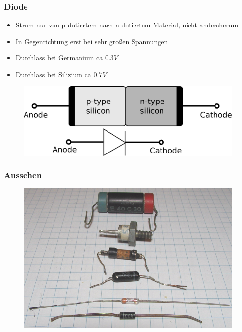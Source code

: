 \begin{frame}
  \frametitle{Diode}
  \begin{center}
    \begin{itemize}
      \item Strom nur von p-dotiertem nach n-dotiertem Material, nicht andersherum
      \item In Gegenrichtung erst bei sehr großen Spannungen
      \item Durchlass bei Germanium ca $0.3V$
      \item Durchlass bei Silizium ca $0.7V$
    \end{itemize}
    \begin{figure}
      \includegraphics[width=.7\textwidth,height=.5\textheight,keepaspectratio]{e12/diode_with_electrical_symbol.png}
    \end{figure}
  \end{center}
\end{frame}

\begin{frame}
  \frametitle{Aussehen}
  \begin{center}
    \begin{figure}
      \includegraphics[width=.9\textwidth,height=.75\textheight,keepaspectratio]{e12/Diodenalt2.png}
    \end{figure}
  \end{center}
\end{frame}

